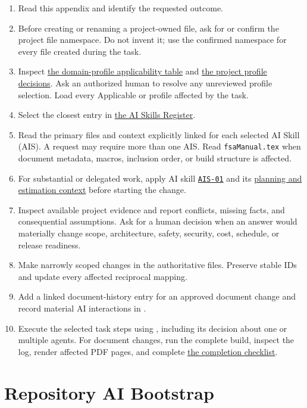 \begin{enumerate}
\item Read this appendix and identify the requested outcome.
\item Before creating or renaming a project-owned file, ask for or confirm the
project file namespace. Do not invent it; use the confirmed namespace for every
file created during the task.
\item Inspect \hyperref[Table:DomainProfileApplicability]{the domain-profile
applicability table} and \hyperref[Table:ProjectDomainProfiles]{the project
profile decisions}. Ask an authorized human to resolve any unreviewed profile
selection. Load every Applicable or \OwnedTBD{} profile affected by the task.
\item Select the closest entry in
\hyperref[Table:AISkills]{the AI Skills Register}.
\item Read the primary files and context explicitly linked for each selected
AI Skill (AIS). A request may require more than one AIS. Read
\texttt{fsaManual.tex} when document metadata, macros, inclusion order, or
build structure is affected.
\item For substantial or delegated work, apply AI skill \hyperref[Skill:AIS-01]{\texttt{AIS-01}}
and its \hyperref[Section:AIPlanningEstimateContext]{planning and estimation
context} before starting the change.
\item Inspect available project evidence and report conflicts, missing facts,
and consequential assumptions. Ask for a human decision when an answer would
materially change scope, architecture, safety, security, cost, schedule, or
release readiness.
\item Make narrowly scoped changes in the authoritative files. Preserve stable
IDs and update every affected reciprocal mapping.
\item Add a linked document-history entry for an approved document change and
record material AI interactions in .
\item Execute the selected task steps using
, including its decision about one or
multiple agents. For document changes, run the complete build, inspect the log,
render affected PDF pages, and
complete \hyperref[Table:AICompletionChecklist]{the completion checklist}.
\end{enumerate}

\section{Repository AI Bootstrap}
\label{Section:AIRepositoryBootstrap}

